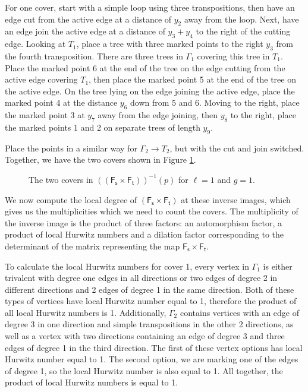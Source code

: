 \documentclass[11pt,reqno]{amsart}
\newcommand{\inputTikZ}[2]{%
     \resizebox{#1}{!}{}}
\theoremstyle{definition}
\newcommand{\Ft}{\mathsf{F_t}}
\newcommand{\Fs}{\mathsf{F_s}}
\begin{document}
For one cover, start with a simple loop using three transpositions, then have an edge cut from the active edge at a distance of $y_2$ away from the loop. Next, have an edge join the active edge at a distance of $y_3+y_4$ to the right of the cutting edge. Looking at $T_1$, place a tree with three marked points to the right $y_3$ from the fourth transposition. There are three trees in $\Gamma_1$ covering this tree in $T_1$. Place the marked point 6 at the end of the tree on the edge cutting from the active edge covering $T_1$, then place the marked point 5 at the end of the tree on the active edge. On the tree lying on the edge joining the active edge, place the marked point 4 at the distance $y_6$ down from 5 and 6. Moving to the right, place the marked point 3 at $y_7$ away from the edge joining, then $y_8$ to the right, place the marked points 1 and 2 on separate trees of length $y_9$. 

Place the points in a similar way for $\Gamma_2 \to T_2$, but with the cut and join switched. Together, we have the two covers shown in Figure \ref{fig:l=1g=1}.
\begin{figure}[tb]
    \centering
    \inputTikZ{.8\textwidth}{Figures/l=1g=1}
    \caption{The two covers in $((\Fs\times\Ft))^{-1}(p)$ for $\ell=1$ and $g=1$.}
    \label{fig:l=1g=1}
\end{figure}

We now compute the local degree of $(\Fs\times\Ft)$ at these inverse images, which gives us the multiplicities which we need to count the covers. The multiplicity of the inverse image is the product of three factors: an automorphism factor, a product of local Hurwitz numbers and a dilation factor corresponding to the determinant of the matrix representing the map $\Fs\times\Ft$. 

To calculate the local Hurwitz numbers for cover 1, every vertex in $\Gamma_1$ is either trivalent with degree one edges in all directions or two edges of degree 2 in different directions and 2 edges of degree 1 in the same direction. Both of these types of vertices have local Hurwitz number equal to 1, therefore the product of all local Hurwitz numbers is 1. Additionally, $\Gamma_2$ contains vertices with an edge of degree 3 in one direction and simple transpositions in the other 2 directions, as well as a vertex with two directions containing an edge of degree 3 and three edges of degree 1 in the third direction. The first of these vertex options has local Hurwitz number equal to 1. The second option, we are marking one of the edges of degree 1, so the local Hurwitz number is also equal to 1. All together, the product of local Hurwitz numbers is equal to 1. 
\end{document}
